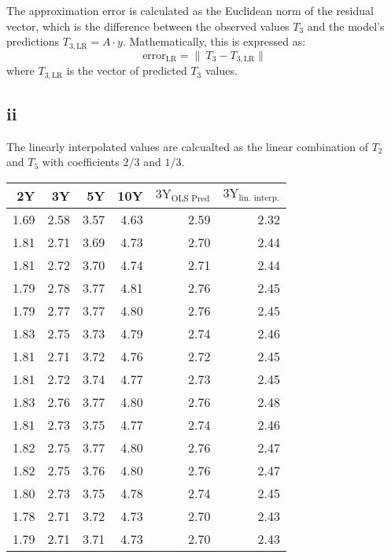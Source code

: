 \documentclass{article}
\begin{document}
The approximation error is calculated as the Euclidean norm of the residual vector, which is the difference between the observed values \( T_3 \) and the model's predictions \( T_{3,\text{LR}} = A \cdot y \). Mathematically, this is expressed as:
\[ \text{error}_{\text{LR}} = \|\ T_3 - T_{3,\text{LR}} \|\]
where \( T_{3,\text{LR}} \) is the vector of predicted \( T_3 \) values.

\subsection*{ii}

The linearly interpolated values are calcualted as
the linear combination of $T_2$ and $T_5$ with coefficients $2/3$ and $1/3$.

\begin{tabular}{rrrrrr}
    \toprule
    2Y   & 3Y   & 5Y   & 10Y  & $\text{3Y}_{\text{OLS Pred}}$ & $\text{3Y}_{\text{lin. interp.}}$ \\
    \midrule
    1.69 & 2.58 & 3.57 & 4.63 & 2.59                          & 2.32                              \\
    1.81 & 2.71 & 3.69 & 4.73 & 2.70                          & 2.44                              \\
    1.81 & 2.72 & 3.70 & 4.74 & 2.71                          & 2.44                              \\
    1.79 & 2.78 & 3.77 & 4.81 & 2.76                          & 2.45                              \\
    1.79 & 2.77 & 3.77 & 4.80 & 2.76                          & 2.45                              \\
    1.83 & 2.75 & 3.73 & 4.79 & 2.74                          & 2.46                              \\
    1.81 & 2.71 & 3.72 & 4.76 & 2.72                          & 2.45                              \\
    1.81 & 2.72 & 3.74 & 4.77 & 2.73                          & 2.45                              \\
    1.83 & 2.76 & 3.77 & 4.80 & 2.76                          & 2.48                              \\
    1.81 & 2.73 & 3.75 & 4.77 & 2.74                          & 2.46                              \\
    1.82 & 2.75 & 3.77 & 4.80 & 2.76                          & 2.47                              \\
    1.82 & 2.75 & 3.76 & 4.80 & 2.76                          & 2.47                              \\
    1.80 & 2.73 & 3.75 & 4.78 & 2.74                          & 2.45                              \\
    1.78 & 2.71 & 3.72 & 4.73 & 2.70                          & 2.43                              \\
    1.79 & 2.71 & 3.71 & 4.73 & 2.70                          & 2.43                              \\
    \bottomrule
\end{tabular}
\end{document}
